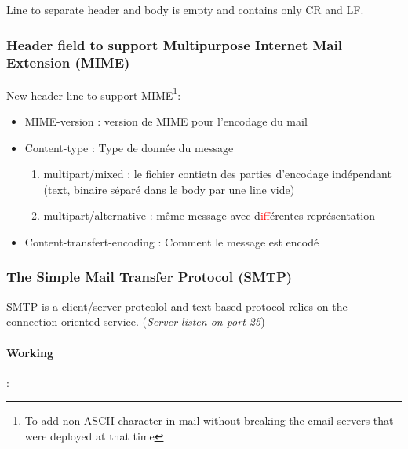 Line to separate header and body is empty and contains only CR and LF.

\subsubsection{Header field to support Multipurpose Internet Mail Extension (MIME)}
New header line to support MIME\footnote{To add non ASCII character in mail without
breaking the email servers that were deployed at that time}:
\begin{itemize}
    \item MIME-version : version de MIME pour l'encodage du mail
    \item Content-type : Type de donnée du message
        \begin{enumerate}
            \item multipart/mixed : le fichier contietn des parties d'encodage
                indépendant (text, binaire séparé dans le body par une line vide)
            \item multipart/alternative : même message avec d\textcolor{red}{if}férentes représentation
        \end{enumerate}
    \item Content-transfert-encoding : Comment le message est encodé
\end{itemize}

\subsubsection{The Simple Mail Transfer Protocol (SMTP)}
SMTP is a client/server protcolol and text-based protocol relies on the
connection-oriented service. (\textit{Server listen on port 25})

\paragraph{Working} :

